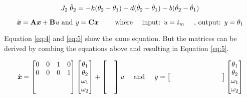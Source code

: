 \begin{equation}
J_2 \; \ddot{\theta}_2 = -k(\theta_2-\theta_1) - d(\dot{\theta}_2-\dot{\theta}_1) - b(\dot{\theta}_2-\dot{\theta}_1)
\label{eq:extra2}
\vspace{.2em}
\end{equation}

\begin{equation}
\dot{\text{\textit{\textbf{x}}}}  = {\text{\textbf{A}}}\text{\textit{\textbf{x}}}  +  {\text{\textbf{B}}}\text{\textit{{u}}}  \text{ and } \text{\textit{{y}}}  = {\text{\textbf{C}}}\text{\textit{\textbf{x}}}  \qquad \text{ where } \quad \text{input: \textit{{u}}}=i_m \quad\text{ , output: \textit{{y}}}=\theta_1
\label{eq:4}
\end{equation}

Equation \ref{eq:4} and \ref{eq:5} show the same equation. But the matrices can be derived by combing the equations above and resulting in Equation \ref{eq:5}.

\begin{equation}
\dot{\text{\textit{\textbf{x}}}}  = \begin{bmatrix}
0 & 0 & 1 & 0 \\
0 & 0 & 0 & 1\\
& & & \\
& & &
\end{bmatrix}
\begin{bmatrix}
\theta_1\\
\theta_2\\
\omega_1\\
\omega_2\\
\end{bmatrix}
+
\begin{bmatrix}
\text{\color{white}hh\color{black}}\\
\text{\color{white}hh\color{black}}\\
\text{\color{white}hh\color{black}}\\
\text{\color{white}hh\color{black}}\\
\end{bmatrix}\text{\textit{{u}}}
\quad \text{ and } \quad
\text{\textit{{y}}}=\begin{bmatrix}
\text{\color{white}hh\color{black}} &\text{\color{white}hh\color{black}}&\text{\color{white}hh\color{black}}&\text{\color{white}hh\color{black}}
\end{bmatrix}
\begin{bmatrix}
\theta_1\\
\theta_2\\
\omega_1\\
\omega_2\\
\end{bmatrix}
\label{eq:5}
\end{equation}